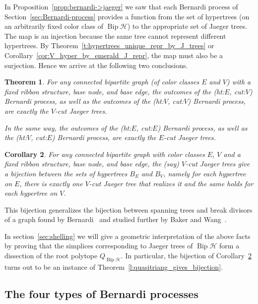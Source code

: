 \documentclass[10pt]{amsart}
\newtheorem{theo}{Theorem}[section]
\newtheorem{coro}[theo]{Corollary}
\theoremstyle{definition}\newtheorem{defi}[theo]{Definition}
\theoremstyle{remark}\newtheorem{rema}[theo]{Remark}
\newcommand{\HH}{\mathcal H}
\DeclareMathOperator{\bip}{Bip}
\begin{document}
In Proposition~\ref{prop:bernardi->jaeger} we saw that each Bernardi process of Section~\ref{sec:Bernardi-process} provides a function from the set of hypertrees (on an arbitrarily fixed color class of $\bip\HH$) to the appropriate set of Jaeger trees. The map is an injection because the same tree cannot represent different hypertrees. By Theorem~\ref{t:hypertrees_unique_repr_by_J_trees} or Corollary~\ref{cor:V_hyper_by_emerald_J_repr}, the map must also be a surjection. Hence we arrive at the following two conclusions.

\begin{theo}\label{t:J-trees_are_B-trees}
For any connected bipartite graph (of color classes $E$ and $V$) with a fixed ribbon structure, base node, and base edge, the outcomes of the (ht:$E$, cut:$V$) Bernardi process, as well as the outcomes of the (ht:$V$, cut:$V$) Bernardi process, are exactly the $V$-cut Jaeger trees.
	
In the same way, the outcomes of the (ht:$E$, cut:$E$) Bernardi process, as well as the (ht:$V$, cut:$E$) Bernardi process, are exactly the $E$-cut Jaeger trees.
\end{theo}

\begin{coro} 
\label{c:Jaeger_hypertree_uniquely_realized}
	For any connected bipartite graph with color classes $E$, $V$ and a fixed ribbon structure, base node, and base edge, the (say) $V$-cut Jaeger trees give a bijection between the sets of hypertrees $B_{E}$ and $B_{V}$, namely for each hypertree on $E$, there is exactly one $V$-cut Jaeger tree that realizes it and the same holds for each hypertree on $V$.
\end{coro}

This bijection generalizes the bijection between spanning trees and break divisors of a graph found by Bernardi~\cite{Bernardi_Tutte} and studied further by Baker and Wang~\cite{Baker-Wang}.

In section~\ref{sec:shelling} we will give a geometric interpretation of the above facts by proving that the simplices corresponding to Jaeger trees of $\bip\HH$ form a dissection of the root polytope $Q_{\bip\HH}$. In particular, the bijection of Corollary~\ref{c:Jaeger_hypertree_uniquely_realized} turns out to be an instance of Theorem~\ref{l:quasitriang_gives_bijection}.


\subsection{The four types of Bernardi processes}
\label{subs:four_Bernardi}
\end{document}
